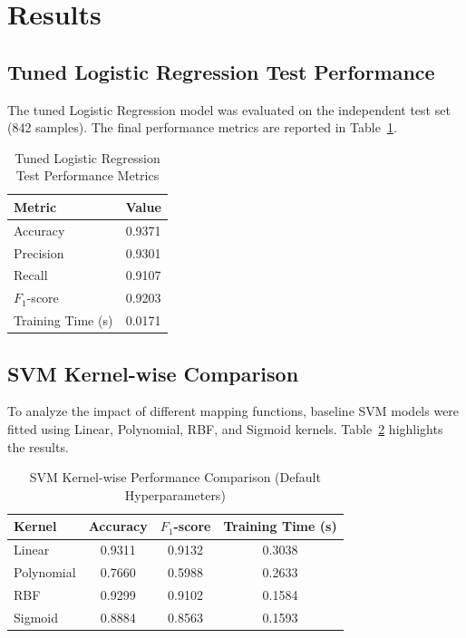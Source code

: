\documentclass[12pt,a4paper]{article}
\begin{document}
\section{Results}

\subsection{Tuned Logistic Regression Test Performance}
The tuned Logistic Regression model was evaluated on the independent test set (842 samples). The final performance metrics are reported in Table~\ref{tab:lr_perf}.

\begin{table}[H]
\centering
\caption{Tuned Logistic Regression Test Performance Metrics}
\label{tab:lr_perf}
\vspace{0.2cm}
\begin{tabular}{lc}
\toprule
\textbf{Metric} & \textbf{Value} \\
\midrule
Accuracy & 0.9371 \\
Precision & 0.9301 \\
Recall & 0.9107 \\
$F_1$-score & 0.9203 \\
Training Time (s) & 0.0171 \\
\bottomrule
\end{tabular}
\end{table}

\subsection{SVM Kernel-wise Comparison}
To analyze the impact of different mapping functions, baseline SVM models were fitted using Linear, Polynomial, RBF, and Sigmoid kernels. Table~\ref{tab:svm_kernel_perf} highlights the results.

\begin{table}[H]
\centering
\caption{SVM Kernel-wise Performance Comparison (Default Hyperparameters)}
\label{tab:svm_kernel_perf}
\vspace{0.2cm}
\begin{tabular}{lccc}
\toprule
\textbf{Kernel} & \textbf{Accuracy} & \textbf{$F_1$-score} & \textbf{Training Time (s)} \\
\midrule
Linear & 0.9311 & 0.9132 & 0.3038 \\
Polynomial & 0.7660 & 0.5988 & 0.2633 \\
RBF & 0.9299 & 0.9102 & 0.1584 \\
Sigmoid & 0.8884 & 0.8563 & 0.1593 \\
\bottomrule
\end{tabular}
\end{table}
\end{document}
